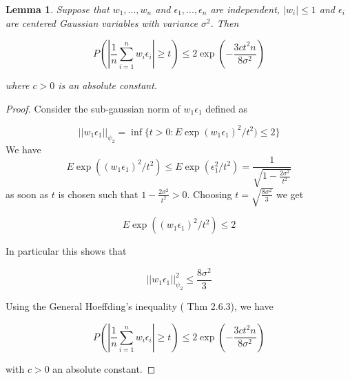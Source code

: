 \documentclass{article}
\newtheorem{lemma}[theorem]{Lemma}
\begin{document}
\begin{lemma}
\label{basic_lemma_2}
Suppose that $w_1,...,w_n$ and $\epsilon_1,...,\epsilon_n$ are 
independent, $|w_i|\leq 1$ and $\epsilon_i$ are centered Gaussian variables with variance $\sigma^2$. Then

\begin{equation*}
    P(|\frac{1}{n}\sum_{i=1}^n w_i\epsilon_i|\geq t)\leq 2\exp(-\frac{3ct^2n}{8\sigma^2})
\end{equation*}

where $c>0$ is an absolute constant.
\end{lemma}
\begin{proof}
Consider the sub-gaussian norm of $w_1\epsilon_1$ defined as 

\begin{equation*}
    ||w_1\epsilon_1||_{\psi_2}=\inf\{t>0: E\exp(w_1\epsilon_1)^2/t^2)\leq 2\}
\end{equation*}
We have
\begin{equation*}
    E\exp( (w_1\epsilon_1)^2/t^2)\leq E\exp(\epsilon_1^2/t^2)=\frac{1}{\sqrt{1-\frac{2\sigma^2}{t^2}}}
\end{equation*}
as soon as $t$ is chosen such that $1-\frac{2\sigma^2}{t^2}>0$. Choosing $t= \sqrt{\frac{8\sigma^2}{3}}$ we get 

\begin{equation*}
    E\exp((w_1\epsilon_1)^2/t^2)\leq 2
\end{equation*}

In particular this shows that 

\begin{equation*}
    ||w_1\epsilon_1||_{\psi_2}^2\leq \frac{8\sigma^2}{3}
\end{equation*}

Using the General Hoeffding's inequality (\cite{vershynin} Thm 2.6.3), we have

\begin{equation*}
    P(|\frac{1}{n}\sum_{i=1}^n w_i\epsilon_i|\geq t)\leq 2\exp(-\frac{3ct^2n}{8\sigma^2})
\end{equation*}

with $c>0$ an absolute constant. 
\end{proof}
 
\end{document}
